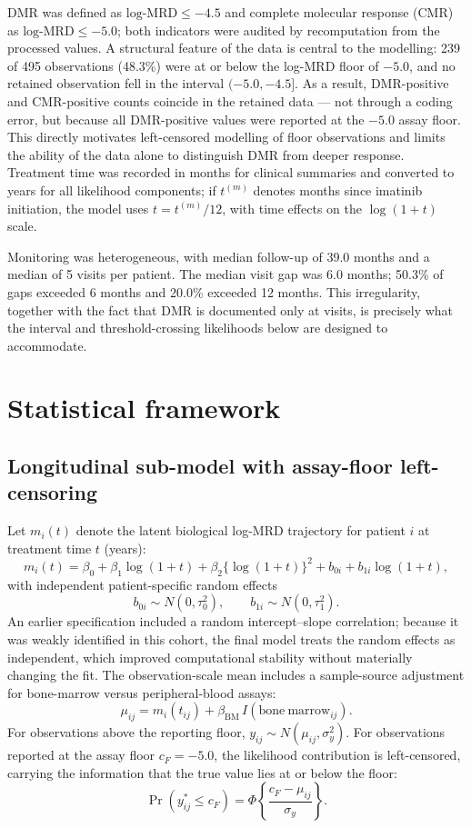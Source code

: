 \documentclass[11pt]{article}
\begin{document}
DMR was defined as $\text{log-MRD}\le-4.5$ and complete molecular response
(CMR) as $\text{log-MRD}\le-5.0$; both indicators were audited by
recomputation from the processed values. A structural feature of the data
is central to the modelling: 239 of 495 observations (48.3\%) were at or
below the log-MRD floor of $-5.0$, and no retained observation fell in the
interval $(-5.0,-4.5]$. As a result, DMR-positive and CMR-positive counts
coincide in the retained data --- not through a coding error, but because
all DMR-positive values were reported at the $-5.0$ assay floor. This
directly motivates left-censored modelling of floor observations and
limits the ability of the data alone to distinguish DMR from deeper
response. Treatment time was recorded in months for clinical summaries and
converted to years for all likelihood components; if $t^{(m)}$ denotes
months since imatinib initiation, the model uses $t=t^{(m)}/12$, with
time effects on the $\log(1+t)$ scale.

Monitoring was heterogeneous, with median follow-up of 39.0 months and a
median of 5 visits per patient. The median visit gap was 6.0 months;
50.3\% of gaps exceeded 6 months and 20.0\% exceeded 12 months. This
irregularity, together with the fact that DMR is documented only at
visits, is precisely what the interval and threshold-crossing likelihoods
below are designed to accommodate.

\section{Statistical framework}
\label{sec:methods}

\subsection{Longitudinal sub-model with assay-floor left-censoring}
\label{sec:long}

Let $m_i(t)$ denote the latent biological log-MRD trajectory for patient
$i$ at treatment time $t$ (years):
\[
m_i(t)=\beta_0+\beta_1\log(1+t)+\beta_2\{\log(1+t)\}^2
+b_{0i}+b_{1i}\log(1+t),
\]
with independent patient-specific random effects
\[
b_{0i}\sim N(0,\tau_0^2), \qquad b_{1i}\sim N(0,\tau_1^2).
\]
An earlier specification included a random intercept--slope correlation;
because it was weakly identified in this cohort, the final model treats the
random effects as independent, which improved computational stability
without materially changing the fit. The observation-scale mean includes a
sample-source adjustment for bone-marrow versus peripheral-blood assays:
\[
\mu_{ij}=m_i(t_{ij})+\beta_{\mathrm{BM}}\,I(\mathrm{bone\ marrow}_{ij}).
\]
For observations above the reporting floor,
$y_{ij}\sim N(\mu_{ij},\sigma_y^2)$. For observations reported at the
assay floor $c_F=-5.0$, the likelihood contribution is left-censored,
carrying the information that the true value lies at or below the floor:
\[
\Pr(y_{ij}^{\ast}\le c_F)=
\Phi\!\left\{\frac{c_F-\mu_{ij}}{\sigma_y}\right\}.
\]
\end{document}
